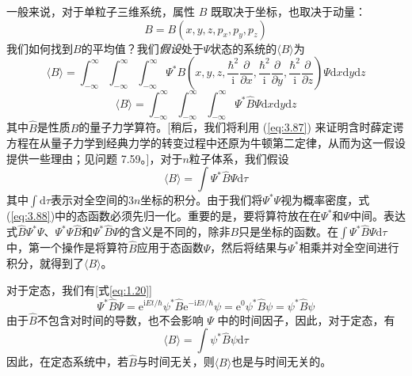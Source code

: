 	一般来说，对于单粒子三维系统，属性 $B$ 既取决于坐标，也取决于动量：
	\begin{equation*}
		B = B\left(x,y,z,p_x,p_y,p_z\right)
	\end{equation*}
	我们如何找到$B$的平均值？我们\textit{假设}处于$\Psi$状态的系统的$\langle B \rangle$为
	\begin{equation*}
		\langle B \rangle = \int_{-\infty}^{\infty}\int_{-\infty}^{\infty}\int_{-\infty}^{\infty}\Psi^{\ast}B\left(x,y,z,\frac{\hbar^2}{\mathrm{i}}\frac{\partial}{\partial x},\frac{\hbar^2}{\mathrm{i}}\frac{\partial}{\partial y},\frac{\hbar^2}{\mathrm{i}}\frac{\partial}{\partial z}\right)\Psi\mathrm{d}x\mathrm{d}y\mathrm{d}z
	\end{equation*}
	\begin{equation}
		\langle B \rangle = \int_{-\infty}^{\infty}\int_{-\infty}^{\infty}\int_{-\infty}^{\infty}\Psi^{\ast}\hat{B}\Psi\mathrm{d}x\mathrm{d}y\mathrm{d}z
		\label{eq:3.87}
	\end{equation}
	其中$\hat{B}$是性质$B$的量子力学算符。[稍后，我们将利用 (\ref{eq:3.87}) 来证明含时薛定谔方程在从量子力学到经典力学的转变过程中还原为牛顿第二定律，从而为这一假设提供一些理由；见问题 7.59。]，对于$n$粒子体系，我们假设
	\begin{equation}
		\boxed{
			\langle B \rangle = \int \Psi^{\ast}\hat{B}\Psi\mathrm{d}\tau
		}
		\label{eq:3.88}
	\end{equation}
	其中$\int\mathrm{d}\tau$表示对全空间的$3n$坐标的积分。由于我们将$\Psi^{\ast}\Psi$视为概率密度，式(\ref{eq:3.88})中的态函数必须先归一化。重要的是，要将算符放在在$\Psi^{\ast}$和$\Psi$中间。表达式$\hat{B}\Psi^{\ast}\Psi$、$\Psi^{\ast}\Psi\hat{B}$和$\Psi^{\ast}\hat{B}\Psi$的含义是不同的，除非$B$只是坐标的函数。在$\int\Psi^{\ast}\hat{B}\Psi\mathrm{d}\tau$中，第一个操作是将算符$\hat{B}$应用于态函数$\Psi$，然后将结果与$\Psi^{\ast}$相乘并对全空间进行积分，就得到了$\langle B \rangle$。

	对于定态，我们有[式\ref{eq:1.20}]
	\begin{equation*}
		\Psi^{\ast}\hat{B}\Psi = \mathrm{e}^{\mathrm{i}Et/\hbar}\psi^{\ast}\hat{B}\mathrm{e}^{-\mathrm{i}Et/\hbar}\psi = \mathrm{e}^{0}\psi^{\ast}\hat{B}\psi = \psi^{\ast}\hat{B}\psi
	\end{equation*}
	由于$\hat{B}$不包含对时间的导数，也不会影响 $\Psi$ 中的时间因子，因此，对于定态，有
	\begin{equation}
		\langle B \rangle = \int \psi^{\ast}\hat{B}\psi\mathrm{d}\tau
		\label{eq:3.89}
	\end{equation}
	因此，在定态系统中，若$\hat{B}$与时间无关，则$\langle B \rangle$也是与时间无关的。

